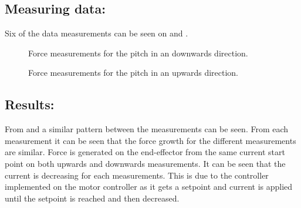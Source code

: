 \subsection*{Measuring data:}
Six of the data measurements can be seen on  and .

\begin{figure}[H]
\centering

\caption{Force measurements for the pitch in an downwards direction.}
\label{fig:pitch_down}
\end{figure}

\begin{figure}[H]
\centering

\caption{Force measurements for the pitch in an upwards direction.}
\label{fig:pitch_up}
\end{figure}





\subsection*{Results:}
From  and  a similar pattern between the measurements can be seen. From each measurement it can be seen that the force growth for the different measurements are similar. Force is generated on the end-effector from the same current start point on both upwards and downwards measurements. It can be seen that the current is decreasing for each measurements. This is due to the controller implemented on the motor controller as it gets a setpoint and current is applied until the setpoint is reached and then decreased.


%
